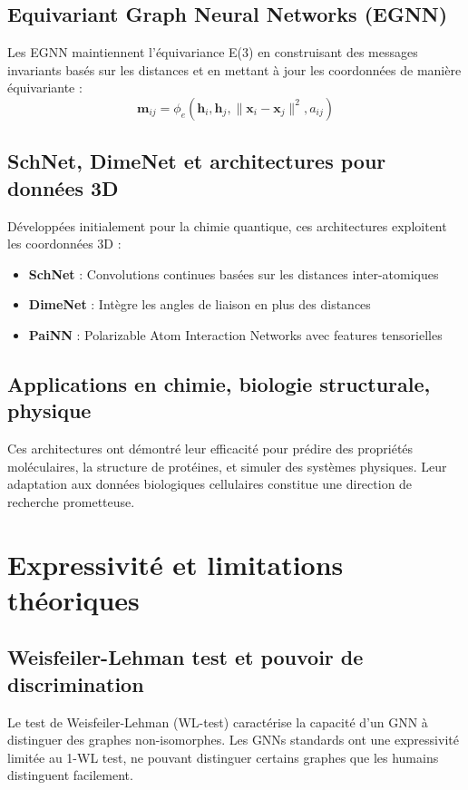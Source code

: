 \subsection{Equivariant Graph Neural Networks (EGNN)}

Les EGNN maintiennent l'équivariance E(3) en construisant des messages invariants basés sur les distances et en mettant à jour les coordonnées de manière équivariante :
\[
\mathbf{m}_{ij} = \phi_e(\mathbf{h}_i, \mathbf{h}_j, \|\mathbf{x}_i - \mathbf{x}_j\|^2, a_{ij})
\]

\subsection{SchNet, DimeNet et architectures pour données 3D}

Développées initialement pour la chimie quantique, ces architectures exploitent les coordonnées 3D :
\begin{itemize}
    \item \textbf{SchNet} : Convolutions continues basées sur les distances inter-atomiques
    \item \textbf{DimeNet} : Intègre les angles de liaison en plus des distances
    \item \textbf{PaiNN} : Polarizable Atom Interaction Networks avec features tensorielles
\end{itemize}

\subsection{Applications en chimie, biologie structurale, physique}

Ces architectures ont démontré leur efficacité pour prédire des propriétés moléculaires, la structure de protéines, et simuler des systèmes physiques. Leur adaptation aux données biologiques cellulaires constitue une direction de recherche prometteuse.

\section{Expressivité et limitations théoriques}

\subsection{Weisfeiler-Lehman test et pouvoir de discrimination}

Le test de Weisfeiler-Lehman (WL-test) caractérise la capacité d'un GNN à distinguer des graphes non-isomorphes. Les GNNs standards ont une expressivité limitée au 1-WL test, ne pouvant distinguer certains graphes que les humains distinguent facilement.

